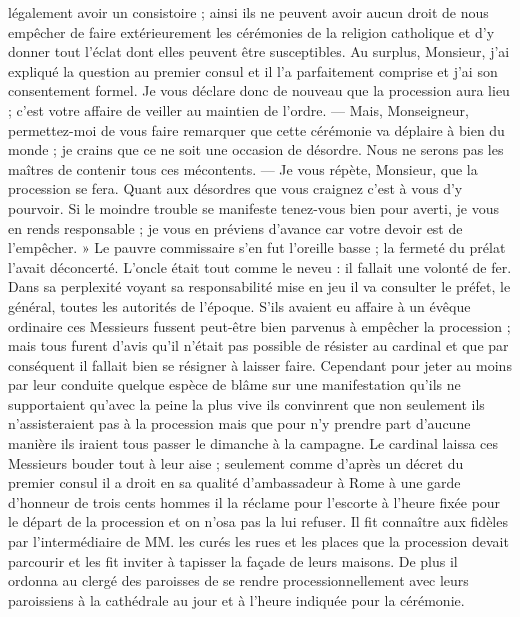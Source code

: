légalement avoir un consistoire ; ainsi ils ne peuvent avoir aucun droit de nous empêcher de faire extérieurement les cérémonies de la religion catholique et d'y donner tout l'éclat dont elles peuvent être susceptibles. Au surplus, Monsieur, j'ai expliqué la question au premier consul et il l'a parfaitement comprise et j'ai son consentement formel. Je vous déclare donc de nouveau que la procession aura lieu ; c'est votre affaire de veiller au maintien de l'ordre. — Mais, Monseigneur, permettez-moi de vous faire remarquer que cette cérémonie va déplaire à bien du monde ; je crains que ce ne soit une occasion de désordre. Nous ne serons pas les maîtres de contenir tous ces mécontents. — Je vous répète, Monsieur, que la procession se fera. Quant aux désordres que vous craignez c'est à vous d'y pourvoir. Si le moindre trouble se manifeste tenez-vous bien pour averti, je vous en rends responsable ; je vous en préviens d'avance car votre devoir est de l'empêcher. » Le pauvre commissaire s'en fut l'oreille basse ; la fermeté du prélat l'avait déconcerté. L'oncle était tout comme le neveu : il fallait une volonté de fer. Dans sa perplexité voyant sa responsabilité mise en jeu il va consulter le préfet, le général, toutes les autorités de l'époque. S'ils avaient eu affaire à un évêque ordinaire ces Messieurs fussent peut-être bien parvenus à empêcher la procession ; mais tous furent d'avis qu'il n'était pas possible de résister au cardinal et que par conséquent il fallait bien se résigner à laisser faire. Cependant pour jeter au moins par leur conduite quelque espèce de blâme sur une manifestation qu'ils ne supportaient qu'avec la peine la plus vive ils convinrent que non seulement ils n'assisteraient pas à la procession mais que pour n'y
prendre part d'aucune manière ils iraient tous passer le dimanche à la campagne. Le cardinal laissa ces Messieurs bouder tout à leur aise ; seulement comme d'après un décret du premier consul il a droit en sa qualité d'ambassadeur à Rome à une garde d'honneur de trois cents hommes il la réclame pour l'escorte à l'heure fixée pour le départ de la procession et on n'osa pas la lui refuser. Il fit connaître aux fidèles par l'intermédiaire de MM. les curés les rues et les places que la procession devait parcourir et les fit inviter à tapisser la façade de leurs maisons. De plus il ordonna au clergé des paroisses de se rendre processionnellement avec leurs paroissiens à la cathédrale au jour et à l'heure indiquée pour la cérémonie.

